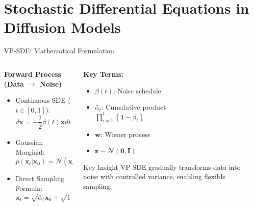 \documentclass[10pt]{beamer}
\begin{document}
\section{Stochastic Differential Equations in Diffusion Models}
\begin{frame}{VP-SDE: Mathematical Formulation}
  \begin{columns}[T]
    \begin{column}{0.65\textwidth}
      \textbf{Forward Process (Data $\rightarrow$ Noise)}
      \begin{itemize} \itemsep -0.1cm
        \item Continuous SDE ($t \in [0, 1]$):
          \vspace{-0.1cm}
          \begin{equation*}
            d\mathbf{x} = -\frac{1}{2}\beta(t)\mathbf{x}dt + \sqrt{\beta(t)}d\mathbf{w}
          \end{equation*}
          \vspace{-0.3cm}
        \item Gaussian Marginal:
          \begin{equation*}
            p(\mathbf{x}_t|\mathbf{x}_0) = \mathcal{N}(\mathbf{x}_t; \sqrt{\bar{\alpha}_t}\mathbf{x}_0, (1-\bar{\alpha}_t)\mathbf{I})
          \end{equation*}
          \vspace{-0.3cm}
        \item Direct Sampling Formula:
          \begin{equation*}
            \mathbf{x}_t = \sqrt{\bar{\alpha}_t}\mathbf{x}_0 + \sqrt{1-\bar{\alpha}_t}\mathbf{z}
          \end{equation*}
      \end{itemize}
    \end{column}

    \begin{column}{0.35\textwidth}
      \textbf{Key Terms:}
      \begin{itemize} \itemsep -0.1cm
        \item $\beta(t)$: Noise schedule
        \item $\bar{\alpha}_t$: Cumulative product\\ $\prod_{i=1}^{t}(1-\beta_i)$
        \item $\mathbf{w}$: Wiener process
        \item $\mathbf{z} \sim \mathcal{N}(\mathbf{0}, \mathbf{I})$
      \end{itemize}

      \begin{alertblock}{Key Insight}
        VP-SDE gradually transforms data into noise with controlled variance, enabling flexible sampling.
      \end{alertblock}
    \end{column}
  \end{columns}
\end{frame}
\end{document}
